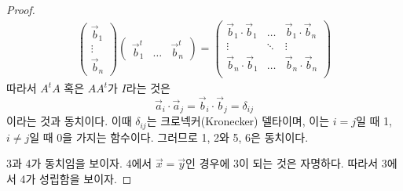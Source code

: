 \documentclass[../engineering_mathematics_lecture_note.tex]{subfiles}
\begin{document}
\begin{proof}
\begin{align*}
\begin{pmatrix}
            \vec b_1 \\ \vdots \\ \vec b_n
        \end{pmatrix}
        \begin{pmatrix}
            \vec b_1^t & \dots & \vec b_n^t
        \end{pmatrix}
        =
        \begin{pmatrix}
            \vec b_1 \cdot \vec b_1 & \dots & \vec b_1 \cdot \vec b_n\\
            \vdots & \ddots & \vdots\\
            \vec b_n \cdot \vec b_1 & \dots & \vec b_n \cdot \vec b_n\\
        \end{pmatrix}
    \end{align*}
    따라서 $A^t A$ 혹은 $AA^t$가 $I$라는 것은
    \begin{equation*}
        \vec a_i \cdot \vec a_j = \vec b_i \cdot \vec b_j = \delta_{ij}
    \end{equation*}
    이라는 것과 동치이다.
    이때 $\delta_{ij}$는 크로넥커(Kronecker) 델타이며, 이는 $i = j$일 때 1, $i \neq j$일 때 0을 가지는 함수이다.
    그러므로 1, 2와 5, 6은 동치이다.

    3과 4가 동치임을 보이자.
    4에서 $\vec x = \vec y$인 경우에 3이 되는 것은 자명하다.
    따라서 3에서 4가 성립함을 보이자.


\end{proof}
\end{document}
